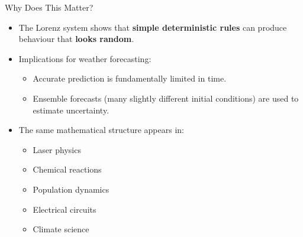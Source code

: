 \begin{frame}{Why Does This Matter?}
  \begin{itemize}
    \item The Lorenz system shows that \textbf{simple deterministic rules} can produce behaviour that \textbf{looks random}.
    \item Implications for weather forecasting:
    \begin{itemize}
      \item Accurate prediction is fundamentally limited in time.
      \item Ensemble forecasts (many slightly different initial conditions) are used to estimate uncertainty.
    \end{itemize}
    \pause
    \item The same mathematical structure appears in:
    \begin{itemize}
      \item Laser physics
      \item Chemical reactions
      \item Population dynamics
      \item Electrical circuits
      \item Climate science
    \end{itemize}
  \end{itemize}
\end{frame}
